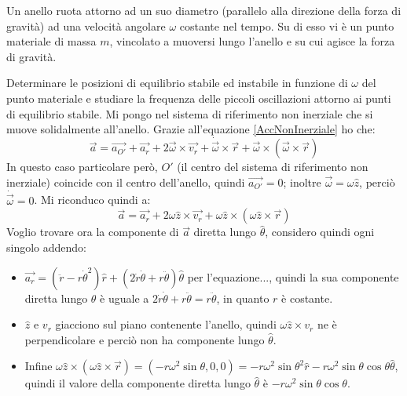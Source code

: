 \documentclass[../main.tex]{subfiles}
\begin{document}
\textex
Un anello ruota attorno ad un suo diametro (parallelo alla direzione della forza di gravità) ad una velocità
angolare $\omega$ costante nel tempo. Su di esso vi è un punto materiale di massa $m$, vincolato a muoversi lungo l'anello e su cui agisce
la forza di gravità.

Determinare le posizioni di equilibrio stabile ed instabile in funzione di $\omega$ del punto materiale e studiare la
frequenza delle piccoli oscillazioni attorno ai punti di equilibrio stabile.
\solution
Mi pongo nel sistema di riferimento non inerziale che si muove solidalmente all'anello. Grazie all'equazione 
\cref{AccNonInerziale}
ho che:
\begin{equation*}
	\overrightarrow{a}=\overrightarrow{a_{O'}}+\overrightarrow{a_r}+2\overrightarrow{\omega}\times \overrightarrow{v_r} 
	+ \dot{\overrightarrow{\omega}}\times \overrightarrow{r}+\overrightarrow{\omega}\times(\overrightarrow{\omega}
	\times\overrightarrow{r})
\end{equation*}
In questo caso particolare però, $O'$ (il centro del sistema di riferimento non inerziale) coincide con il centro
dell'anello, quindi $\overrightarrow{a_{O'}}=0$; inoltre $\overrightarrow{\omega}=\omega \hat{z}$, perciò
$\dot{\overrightarrow{\omega}}=0$. Mi riconduco quindi a:
\begin{equation*}
	\overrightarrow{a}=\overrightarrow{a_r}+2\omega\hat{z}\times \overrightarrow{v_r} 
	+\omega\hat{z}\times(\omega\hat{z}\times\overrightarrow{r})
\end{equation*}
Voglio trovare ora la componente di $\overrightarrow{a}$ diretta lungo $\hat{\theta}$, considero quindi ogni singolo
addendo:
\begin{itemize}
	\item	$\overrightarrow{a_r}=(\ddot{r}-r\dot{\theta}^2)\hat{r}+(2\dot{r}\dot{\theta}+r\ddot{\theta})\hat{\theta}$
			per l'equazione..., quindi la sua componente diretta lungo $\theta$ è uguale a $
			2\dot{r}\dot{\theta}+r\ddot{\theta}=r\ddot{\theta}$, in quanto $r$ è costante.
	\item	$\hat{z}$ e $v_r$ giacciono sul piano contenente l'anello, quindi $\omega\hat{z}\times v_r$ ne è perpendicolare
			e perciò non ha componente lungo $\hat{\theta}$.
	\item	Infine $\omega\hat{z}\times(\omega\hat{z}\times\overrightarrow{r})=
			(-r\omega^2\sin\theta,0,0)=-r\omega^2\sin\theta^2\hat{r}-r\omega^2\sin\theta\cos\theta\hat{\theta}$,
			quindi il valore della componente diretta lungo $\hat\theta$ è $-r\omega^2\sin\theta\cos\theta$.
\end{itemize}
\end{document}
